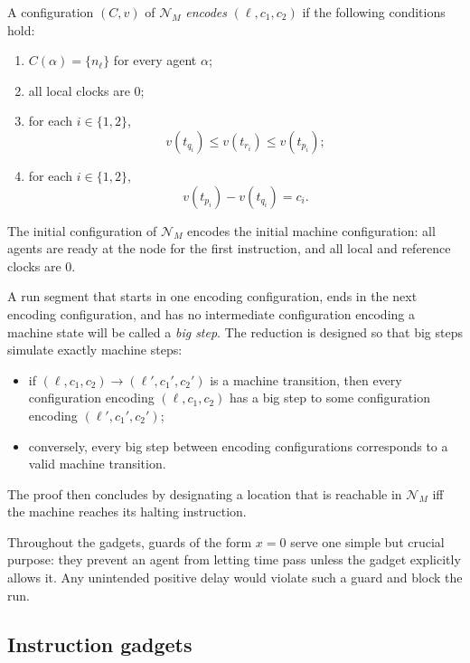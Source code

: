 A configuration $(C,v)$ of $\mathcal N_M$ \emph{encodes}
$(\ell,c_1,c_2)$ if the following conditions hold:
\begin{enumerate}
\item $C(\alpha)=\{n_\ell\}$ for every agent $\alpha$;
\item all local clocks are $0$;
\item for each $i\in\{1,2\}$,
      \[
      v(t_{q_i})\le v(t_{r_i})\le v(t_{p_i});
      \]
\item for each $i\in\{1,2\}$,
      \[
      v(t_{p_i})-v(t_{q_i})=c_i.
      \]
\end{enumerate}

The initial configuration of $\mathcal N_M$ encodes the initial machine
configuration: all agents are ready at the node for the first instruction, and
all local and reference clocks are $0$.

A run segment that starts in one encoding configuration, ends in the next
encoding configuration, and has no intermediate configuration encoding a machine
state will be called a \emph{big step}.  The reduction is designed so that big
steps simulate exactly machine steps:
\begin{itemize}
\item if $(\ell,c_1,c_2)\to (\ell',c_1',c_2')$ is a machine transition, then
      every configuration encoding $(\ell,c_1,c_2)$ has a big step to some
      configuration encoding $(\ell',c_1',c_2')$;
\item conversely, every big step between encoding configurations corresponds to
      a valid machine transition.
\end{itemize}

The proof then concludes by designating a location that is reachable in
$\mathcal N_M$ iff the machine reaches its halting instruction.

Throughout the gadgets, guards of the form $x=0$ serve one simple but crucial
purpose: they prevent an agent from letting time pass unless the gadget
explicitly allows it.  Any unintended positive delay would violate such a guard
and block the run.

\subsection{Instruction gadgets}
\label{subsec:gadgets}

